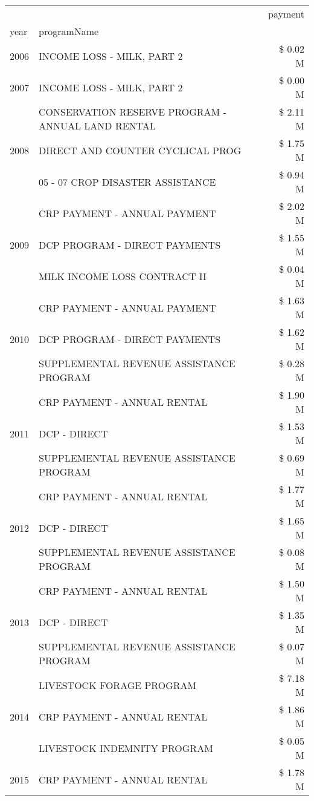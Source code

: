 \begin{tabular}{llr}
\toprule
 &  & payment \\
year & programName &  \\
\midrule
2006 & INCOME LOSS - MILK, PART 2 & \$ 0.02 M \\
\cline{1-3}
2007 & INCOME LOSS - MILK, PART 2 & \$ 0.00 M \\
\cline{1-3}
\multirow[t]{3}{*}{2008} & CONSERVATION RESERVE PROGRAM - ANNUAL LAND RENTAL & \$ 2.11 M \\
 & DIRECT AND COUNTER CYCLICAL PROG & \$ 1.75 M \\
 & 05 - 07 CROP DISASTER ASSISTANCE & \$ 0.94 M \\
\cline{1-3}
\multirow[t]{3}{*}{2009} & CRP PAYMENT - ANNUAL PAYMENT & \$ 2.02 M \\
 & DCP PROGRAM - DIRECT PAYMENTS & \$ 1.55 M \\
 & MILK INCOME LOSS CONTRACT II & \$ 0.04 M \\
\cline{1-3}
\multirow[t]{3}{*}{2010} & CRP PAYMENT - ANNUAL PAYMENT & \$ 1.63 M \\
 & DCP PROGRAM - DIRECT PAYMENTS & \$ 1.62 M \\
 & SUPPLEMENTAL REVENUE ASSISTANCE PROGRAM & \$ 0.28 M \\
\cline{1-3}
\multirow[t]{3}{*}{2011} & CRP PAYMENT - ANNUAL RENTAL & \$ 1.90 M \\
 & DCP - DIRECT & \$ 1.53 M \\
 & SUPPLEMENTAL REVENUE ASSISTANCE PROGRAM & \$ 0.69 M \\
\cline{1-3}
\multirow[t]{3}{*}{2012} & CRP PAYMENT - ANNUAL RENTAL & \$ 1.77 M \\
 & DCP - DIRECT & \$ 1.65 M \\
 & SUPPLEMENTAL REVENUE ASSISTANCE PROGRAM & \$ 0.08 M \\
\cline{1-3}
\multirow[t]{3}{*}{2013} & CRP PAYMENT - ANNUAL RENTAL & \$ 1.50 M \\
 & DCP - DIRECT & \$ 1.35 M \\
 & SUPPLEMENTAL REVENUE ASSISTANCE PROGRAM & \$ 0.07 M \\
\cline{1-3}
\multirow[t]{3}{*}{2014} & LIVESTOCK FORAGE PROGRAM & \$ 7.18 M \\
 & CRP PAYMENT - ANNUAL RENTAL & \$ 1.86 M \\
 & LIVESTOCK INDEMNITY PROGRAM & \$ 0.05 M \\
\cline{1-3}
\multirow[t]{3}{*}{2015} & CRP PAYMENT - ANNUAL RENTAL & \$ 1.78 M \\

\end{tabular}
